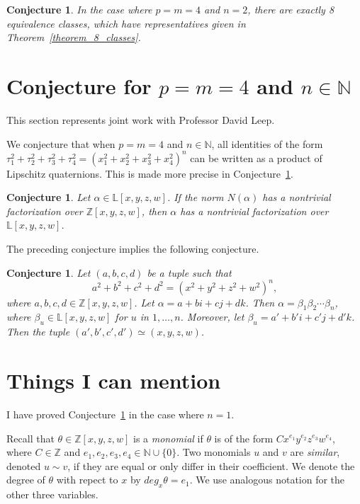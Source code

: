 \documentclass[12pt]{article}
\newtheorem{conjecture}[theorem]{Conjecture}
\theoremstyle{definition}
\theoremstyle{remark}
\newcommand{\Nnn}{\mathbb N}
\newcommand{\Zzz}{\mathbb Z}
\newcommand{\Lll}{\mathbb L}
\numberwithin{equation}{section}
\begin{document}
\begin{conjecture}
In the case where  \(p = m = 4\) and \(n = 2\),
there are exactly 8 equivalence classes, which have representatives
given in Theorem~\ref{theorem_8_classes}.
\end{conjecture}


\section{Conjecture for \(p = m = 4\) and \( n \in \Nnn \)}
This section represents joint work with Professor David Leep.

We conjecture that when \(p = m = 4\) and \( n \in \Nnn \),
all identities of the form
\(
\tau_1 ^ 2  + \tau_2 ^ 2  + \tau_3 ^ 2  + \tau_4 ^ 2  
= 
\left(  x_1 ^ 2 + x_2 ^ 2 + x_3 ^ 2 + x_4 ^ 2
\right) ^ n 
\)
can be written as
a product of Lipschitz quaternions.
This is made more precise in
Conjecture~\ref{conjecture_Ehrenborg-Leep}.

\begin{conjecture}
Let \( \alpha \in \Lll[x,y,z,w] \).
If the norm \( N(\alpha) \) has a nontrivial
factorization over \( \Zzz[x,y,z,w] \),
then \( \alpha \) has a nontrivial
factorization over \( \Lll[x,y,z,w] \).
\end{conjecture}
The preceding conjecture implies the following conjecture.
\begin{conjecture}
\label{conjecture_Ehrenborg-Leep}
Let \( (a, b, c, d) \) be a tuple such that
\[
a^2 + b^2 + c^2 + d^2 = (x^2 + y^2 + z^2 + w^2)^n,
\] 
where \( a, b, c, d \in \Zzz[x,y,z,w]\).
Let \(\alpha = a + bi + cj + dk \).
Then \( \alpha = \beta_1 \beta_2 \cdots \beta_n \),
where \( \beta_u \in \Lll[x,y,z,w] \) for \(u\) in \(1, \ldots, n\).
Moreover, let \( \beta_u = a' + b'i + c'j + d'k \). Then
the tuple \( (a', b', c', d') \simeq (x, y, z, w) \).
\end{conjecture}



\section{Things I can mention}
I have proved Conjecture~\ref{conjecture_Ehrenborg-Leep}
in the case where \(n = 1\).


Recall that \( \theta \in \Zzz[x,y,z,w] \) is a \emph{monomial} if \( \theta \)
is of the form \(Cx^{e_1}y^{e_2}z^{e_3}w^{e_4}\), where \( C \in \Zzz \)
and \( e_1,e_2,e_3,e_4 \in \Nnn \cup \{0\} \).
Two monomials \( u\) and \( v \) are \emph{similar}, denoted  \( u \sim v \),
if they are equal or only differ in their
coefficient.
We denote the degree of  \( \theta \) with repect to \(x\) 
by  \(deg_x \theta = e_1 \). We use analogous notation for the
other three variables.
\end{document}
